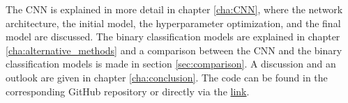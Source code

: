 The CNN is explained in more detail in chapter \ref{cha:CNN}, where the network architecture, the initial model, the hyperparameter optimization, and the final model are discussed.
The binary classification models are explained in chapter \ref{cha:alternative_methods} and a comparison between the CNN and the binary classification models is made in section \ref{sec:comparison}.
A discussion and an outlook are given in chapter \ref{cha:conclusion}. 
The code can be found in the corresponding GitHub repository \cite{project} or directly via the \href{https://github.com/joeyko2706/MachineLearning24/tree/main}{link}.




